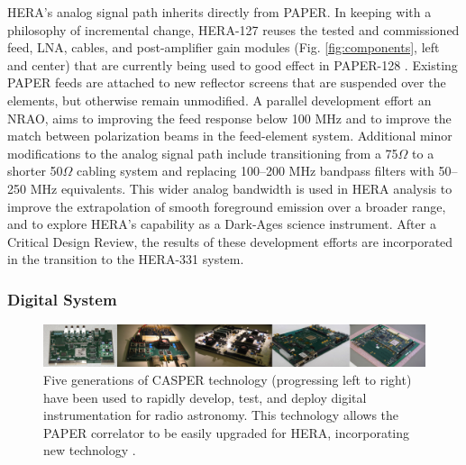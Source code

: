 \documentclass[preprint]{aastex}
\newcommand{\compress}{\vspace{-0.3in}}
\begin{document}
HERA's analog signal path inherits directly from PAPER.
In keeping with a philosophy of
incremental change,
HERA-127 reuses the tested and commissioned feed, LNA, cables, and post-amplifier gain modules
(Fig. \ref{fig:components}, left and center) that are currently being
used to good effect in PAPER-128 \citep{parsons_et_al2010}.  Existing PAPER feeds are attached to new
reflector screens that are suspended over the elements, but otherwise remain unmodified.
A parallel development effort an NRAO, aims to improving the feed response below
100 MHz 
and to improve the match between polarization beams in the feed-element system.  
Additional
minor modifications to the analog signal path include transitioning from a 75$\Omega$ to a
shorter 50$\Omega$ cabling system and replacing 100--200 MHz bandpass filters with 50--250 MHz equivalents.
This wider analog bandwidth is used in HERA analysis to improve the extrapolation of smooth foreground
emission over a broader range, and to explore HERA's capability as a Dark-Ages science instrument.
After a Critical Design Review, the results of these development efforts are incorporated in
the transition to the HERA-331 system.  

%



\compress
\subsubsection{Digital System}
\label{sec:digital}

\begin{figure}[t]\centering
\includegraphics[width=6.5in]{plots/casper_boards.jpg}
\caption{\small
Five generations of CASPER technology (progressing left to right) have been used to rapidly
develop, test, and deploy digital instrumentation for radio astronomy.  This technology
allows the PAPER correlator to be 
easily upgraded for HERA, incorporating new technology
\citep{parsons_et_al2006,parsons_et_al2008}.
}\label{fig:casper_boards}
\end{figure}
\end{document}
